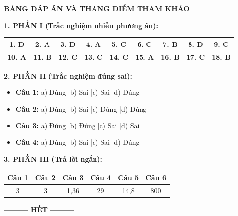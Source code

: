 \documentclass[12pt,a4paper]{article}
\begin{document}
\newpage
\noindent
\textbf{\large BẢNG ĐÁP ÁN VÀ THANG ĐIỂM THAM KHẢO}
\smallskip

\noindent
\textbf{1. PHẦN I (Trắc nghiệm nhiều phương án):}
\begin{center}
\begin{tabular}{|c|c|c|c|c|c|c|c|c|}
\hline
\textbf{1. D} & \textbf{2. A} & \textbf{3. D} & \textbf{4. A} & \textbf{5. C} & \textbf{6. C} & \textbf{7. B} & \textbf{8. D} & \textbf{9. C} \\ \hline
\textbf{10. A} & \textbf{11. B} & \textbf{12. C} & \textbf{13. C} & \textbf{14. C} & \textbf{15. A} & \textbf{16. B} & \textbf{17. C} & \textbf{18. B} \\ \hline
\end{tabular}
\end{center}

\noindent
\textbf{2. PHẦN II (Trắc nghiệm đúng sai):}
\begin{itemize}
	\item \textbf{Câu 1:} a) Đúng \quad|\quad b) Sai \quad|\quad c) Sai \quad|\quad d) Đúng
	\item \textbf{Câu 2:} a) Đúng \quad|\quad b) Sai \quad|\quad c) Đúng \quad|\quad d) Đúng
	\item \textbf{Câu 3:} a) Đúng \quad|\quad b) Đúng \quad|\quad c) Sai \quad|\quad d) Sai
	\item \textbf{Câu 4:} a) Đúng \quad|\quad b) Sai \quad|\quad c) Sai \quad|\quad d) Đúng
\end{itemize}

\noindent
\textbf{3. PHẦN III (Trả lời ngắn):}
\begin{center}
\begin{tabular}{|c|c|c|c|c|c|}
\hline
\textbf{Câu 1} & \textbf{Câu 2} & \textbf{Câu 3} & \textbf{Câu 4} & \textbf{Câu 5} & \textbf{Câu 6} \\ \hline
3 & 3 & 1,36 & 29 & 14,8 & 800 \\ \hline
\end{tabular}
\end{center}

\begin{center}
\textbf{--------- HẾT ---------}
\end{center}
\end{document}
